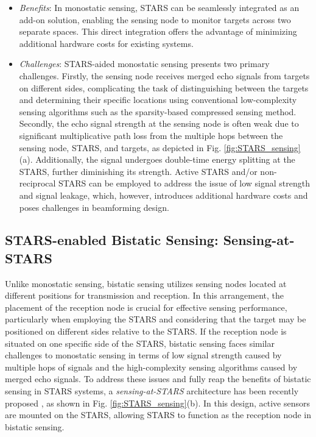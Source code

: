 \documentclass[journal]{IEEEtran}
\theoremstyle{definition}
\begin{document}
\begin{itemize}
    \item \emph{Benefits}: In monostatic sensing, STARS can be seamlessly integrated as an add-on solution, enabling the sensing node to monitor targets across two separate spaces. This direct integration offers the advantage of minimizing additional hardware costs for existing systems.

    \item \emph{Challenges}: STARS-aided monostatic sensing presents two primary challenges. Firstly, the sensing node receives merged echo signals from targets on different sides, complicating the task of distinguishing between the targets and determining their specific locations using conventional low-complexity sensing algorithms such as the sparsity-based compressed sensing method. Secondly, the echo signal strength at the sensing node is often weak due to significant multiplicative path loss from the multiple hops between the sensing node, STARS, and targets, as depicted in Fig. \ref{fig:STARS_sensing}(a). Additionally, the signal undergoes double-time energy splitting at the STARS, further diminishing its strength. Active STARS and/or non-reciprocal STARS can be employed to address the issue of low signal strength and signal leakage, which, however, introduces additional hardware costs and poses challenges in beamforming design.
\end{itemize}

\subsection{STARS-enabled Bistatic Sensing: Sensing-at-STARS}

Unlike monostatic sensing, bistatic sensing utilizes sensing nodes located at different positions for transmission and reception. In this arrangement, the placement of the reception node is crucial for effective sensing performance, particularly when employing the STARS and considering that the target may be positioned on different sides relative to the STARS. If the reception node is situated on one specific side of the STARS, bistatic sensing faces similar challenges to monostatic sensing in terms of low signal strength caused by multiple hops of signals and the high-complexity sensing algorithms caused by merged echo signals. To address these issues and fully reap the benefits of bistatic sensing in STARS systems, a \emph{sensing-at-STARS} architecture has been recently proposed \cite{wang2023stars}, as shown in Fig. \ref{fig:STARS_sensing}(b). In this design, active sensors are mounted on the STARS, allowing STARS to function as the reception node in bistatic sensing.
\end{document}
